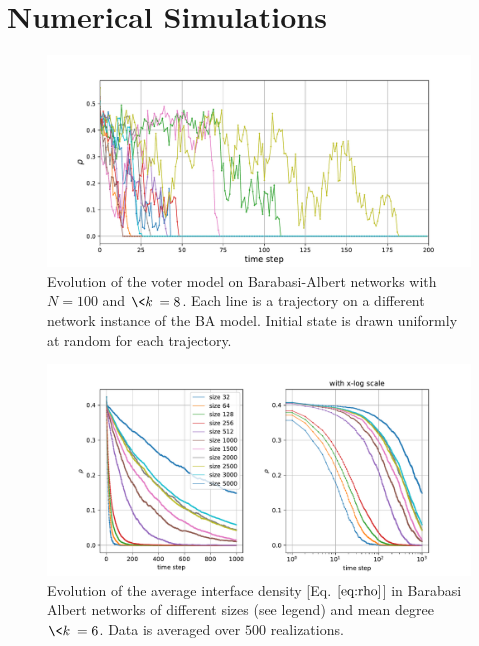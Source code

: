 \section{Numerical Simulations}
\begin{figure}[H]
    \centering
    \includegraphics[width=\linewidth]{latex_source/images/voter/example_evolution.pdf}
    \caption{Evolution of the voter model on Barabasi-Albert networks with $N=100$ and $\<k\> = 8$. Each line is a trajectory on a different network instance of the BA model. Initial state is drawn uniformly at random for each trajectory.}
    \label{fig:enter-label}
\end{figure}

\begin{figure}[H]
    \centering
    \includegraphics[width=\linewidth]{latex_source/images/voter/BA_node_update_rule_results_logscale.pdf}
    \caption{Evolution of the average interface density [Eq. $\ref{eq:rho}$] in Barabasi Albert networks of different sizes (see legend) and mean degree $\<k\>= 6$. Data is averaged over $500$ realizations. }
    \label{fig:BA_evolution}
\end{figure}

